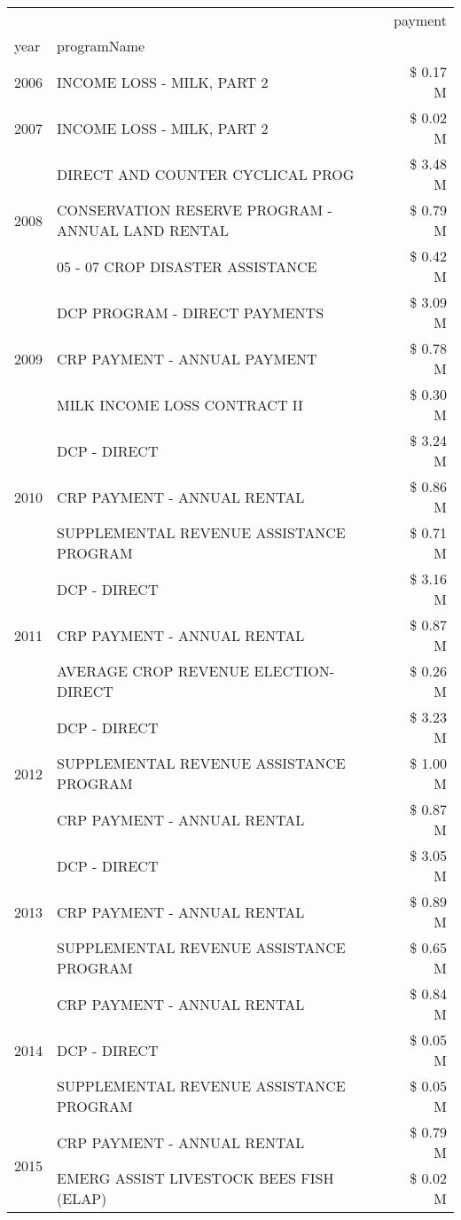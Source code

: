 \begin{tabular}{llr}
\toprule
 &  & payment \\
year & programName &  \\
\midrule
2006 & INCOME LOSS - MILK, PART 2 & \$ 0.17 M \\
\cline{1-3}
2007 & INCOME LOSS - MILK, PART 2 & \$ 0.02 M \\
\cline{1-3}
\multirow[t]{3}{*}{2008} & DIRECT AND COUNTER CYCLICAL PROG & \$ 3.48 M \\
 & CONSERVATION RESERVE PROGRAM - ANNUAL LAND RENTAL & \$ 0.79 M \\
 & 05 - 07 CROP DISASTER ASSISTANCE & \$ 0.42 M \\
\cline{1-3}
\multirow[t]{3}{*}{2009} & DCP PROGRAM - DIRECT PAYMENTS & \$ 3.09 M \\
 & CRP PAYMENT - ANNUAL PAYMENT & \$ 0.78 M \\
 & MILK INCOME LOSS CONTRACT II & \$ 0.30 M \\
\cline{1-3}
\multirow[t]{3}{*}{2010} & DCP - DIRECT & \$ 3.24 M \\
 & CRP PAYMENT - ANNUAL RENTAL & \$ 0.86 M \\
 & SUPPLEMENTAL REVENUE ASSISTANCE PROGRAM & \$ 0.71 M \\
\cline{1-3}
\multirow[t]{3}{*}{2011} & DCP - DIRECT & \$ 3.16 M \\
 & CRP PAYMENT - ANNUAL RENTAL & \$ 0.87 M \\
 & AVERAGE CROP REVENUE ELECTION-DIRECT & \$ 0.26 M \\
\cline{1-3}
\multirow[t]{3}{*}{2012} & DCP - DIRECT & \$ 3.23 M \\
 & SUPPLEMENTAL REVENUE ASSISTANCE PROGRAM & \$ 1.00 M \\
 & CRP PAYMENT - ANNUAL RENTAL & \$ 0.87 M \\
\cline{1-3}
\multirow[t]{3}{*}{2013} & DCP - DIRECT & \$ 3.05 M \\
 & CRP PAYMENT - ANNUAL RENTAL & \$ 0.89 M \\
 & SUPPLEMENTAL REVENUE ASSISTANCE PROGRAM & \$ 0.65 M \\
\cline{1-3}
\multirow[t]{3}{*}{2014} & CRP PAYMENT - ANNUAL RENTAL & \$ 0.84 M \\
 & DCP - DIRECT & \$ 0.05 M \\
 & SUPPLEMENTAL REVENUE ASSISTANCE PROGRAM & \$ 0.05 M \\
\cline{1-3}
\multirow[t]{3}{*}{2015} & CRP PAYMENT - ANNUAL RENTAL & \$ 0.79 M \\
 & EMERG ASSIST LIVESTOCK BEES FISH (ELAP) & \$ 0.02 M \\

\end{tabular}
